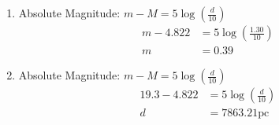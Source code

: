 \documentclass{article}
\begin{document}
\begin{enumerate}
\begin{enumerate}
        \item
        
        Absolute Magnitude: $m-M = 5\log(\frac{d}{10})$
        \begin{align*}
            m - 4.822 &= 5\log(\frac{1.30}{10})\\
            m &= 0.39
        \end{align*}
        
        \item
        
        Absolute Magnitude: $m-M = 5\log(\frac{d}{10})$
        \begin{align*}
            19.3 - 4.822 &= 5\log(\frac{d}{10})\\
            d &= 7863.21\text{pc}
        \end{align*}
        
    \end{enumerate}
    
\end{enumerate}
\end{document}
